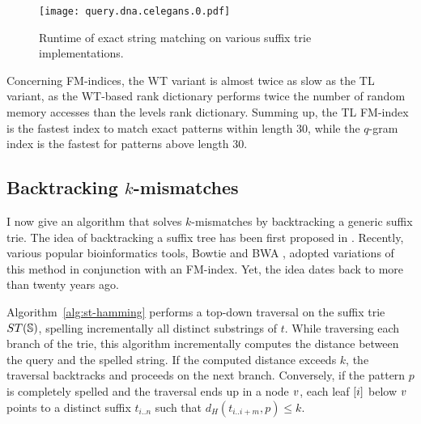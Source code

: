 \begin{figure}[b]
\begin{center}
\caption[Exact string matching runtime]{Runtime of exact string matching on various suffix trie implementations.}
\label{fig:query-dna-exact}
\texttt{[image: query.dna.celegans.0.pdf]}
\end{center}
\end{figure}


Concerning FM-indices, the WT variant is almost twice as slow as the TL variant, as the WT-based rank dictionary performs twice the number of random memory accesses than the levels rank dictionary.
Summing up, the TL FM-index is the fastest index to match exact patterns within length 30, while the $q$-gram index is the fastest for patterns above length 30.

%

\subsection{Backtracking $k$-mismatches}
\label{sec:index:algo:kmismatches}

I now give an algorithm that solves $k$-mismatches by backtracking a generic suffix trie.
The idea of backtracking a suffix tree has been first proposed in \citep{Ukkonen1993}.
Recently, various popular bioinformatics tools, \eg Bowtie \citep{Langmead2009} and BWA \citep{Li2009}, adopted variations of this method in conjunction with an FM-index.
Yet, the idea dates back to more than twenty years ago.

Algorithm~\ref{alg:st-hamming} performs a top-down traversal on the suffix trie $ST(\mathbb{S})$, spelling incrementally all distinct substrings of $t$.
While traversing each branch of the trie, this algorithm incrementally computes the distance between the query and the spelled string.
If the computed distance exceeds $k$, the traversal backtracks and proceeds on the next branch.
Conversely, if the pattern $p$ is completely spelled and the traversal ends up in a node $v$, each leaf $[i]$ below $v$ points to a distinct suffix $t_{i..n}$ such that $d_H(t_{i..i+m}, p) \leq k$.

